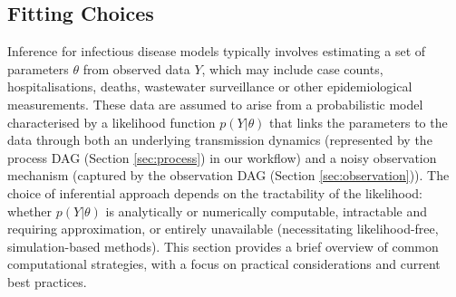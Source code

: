 \documentclass{article}
\begin{document}
\subsection{Fitting Choices}\label{sec:fitting}

Inference for infectious disease models typically involves estimating a set of parameters $\theta$ from observed data $Y$, which may include case counts, hospitalisations, deaths, wastewater surveillance or other epidemiological measurements. These data are assumed to arise from a probabilistic model characterised by a likelihood function $p(Y | \theta)$ that links the parameters to the data through both an underlying transmission dynamics (represented by the process DAG (Section \ref{sec:process}) in our workflow) and a noisy observation mechanism (captured by the observation DAG (Section \ref{sec:observation})).  The choice of inferential approach depends on the tractability of the likelihood: 
whether $ p(Y | \theta)$ is analytically or numerically computable, intractable and requiring approximation, or entirely  unavailable (necessitating likelihood-free, simulation-based methods). This section provides a brief overview of common computational strategies, with a focus on practical considerations and current best practices.
\end{document}
